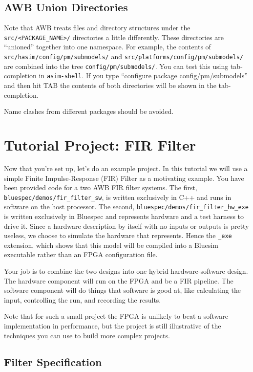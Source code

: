 \documentclass{article}
\begin{document}
\subsection{AWB Union Directories}

Note that AWB treats files and directory structures under the \texttt{src/<PACKAGE\_NAME>/} directories a little differently. These directories are ``unioned''
together into one namespace. For example, the contents of \texttt{src/hasim/config/pm/submodels/} and \texttt{src/platforms/config/pm/submodels/} are combined into the tree
\texttt{config/pm/submodels/}. You can test this using tab-completion in \texttt{asim-shell}. If you type ``configure package config/pm/submodels'' and then hit
TAB the contents of both directories will be shown in the tab-completion.

Name clashes from different packages should be avoided.

\section{Tutorial Project: FIR Filter}

Now that you're set up, let's do an example project. In this tutorial we will use a simple Finite Impulse-Response (FIR) Filter as a
motivating example. You have been provided code for a two AWB FIR filter systems. The first,
\texttt{bluespec/demos/fir\_filter\_sw}, is written exclusively in C++ and runs in software on the host processor. The second,
\texttt{bluespec/demos/fir\_filter\_hw\_exe} is written exclusively in Bluespec and represents hardware and a test harness to drive
it. Since a hardware description by itself with no inputs or outputs is pretty useless, we choose to simulate the hardware that
represents. Hence the \texttt{\_exe} extension, which shows that this model will be compiled into a Bluesim executable rather than
an FPGA configuration file.

Your job is to combine the two designs into one hybrid hardware-software design. The hardware component will run on the FPGA and be
a FIR pipeline. The software component will do things that software is good at, like calculating the input, controlling the run, and
recording the results.

Note that for such a small project the FPGA is unlikely to beat a software implementation in performance, but the project is still
illustrative of the techniques you can use to build more complex projects.

\subsection{Filter Specification}
\end{document}
